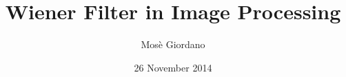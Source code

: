 \documentclass[10pt]{beamer}
\title{Wiener Filter in Image Processing}
\author{Mosè Giordano}
\date{26 November 2014}
\institute[UniSalento and INFN Lecce]{Università del Salento and INFN Lecce}
\begin{document}
\begin{frame}[plain]
  \maketitle
\end{frame}
\end{document}
